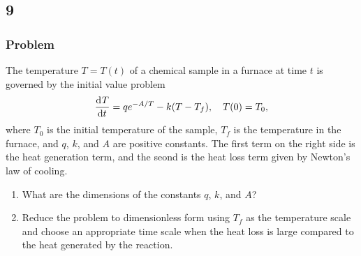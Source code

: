\documentclass[12pt]{article}
\begin{document}
\newpage
\subsection{9}
\subsubsection*{Problem}

The temperature $T=T(t)$ of a chemical sample in a furnace at time $t$ is
governed by the initial value problem
\begin{equation}
  \label{eq:9-problem}
  \frac{\mathrm{d}^{} {T}}{\mathrm{d}{t}^{}}=qe^{-A/T}-k(T-T_f),\quad T(0)=T_0,
\end{equation}
where $T_0$ is the initial temperature of the sample, $T_f$ is the temperature
in the furnace, and $q$, $k$, and $A$ are positive constants. The first term on
the right side is the heat generation term, and the seond is the heat loss term
given by Newton's law of cooling.
\begin{enumerate}
\item What are the dimensions of the constants $q$, $k$, and $A$?
\item Reduce the problem to dimensionless form using $T_f$ as the temperature
  scale and choose an appropriate time scale when the heat loss is large
  compared to the heat generated by the reaction.
\end{enumerate}
\end{document}
